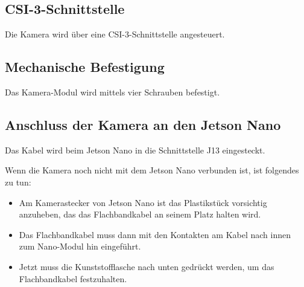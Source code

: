 \bigskip

\subsection{CSI-3-Schnittstelle}



Die Kamera wird über eine CSI-3-Schnittstelle angesteuert. 

\bigskip


\subsection{Mechanische Befestigung}


Das Kamera-Modul wird mittels vier Schrauben befestigt.


\subsection{Anschluss der Kamera an den Jetson Nano}


Das Kabel wird beim Jetson Nano in die Schnittstelle J13 eingesteckt.

Wenn die Kamera noch nicht mit dem Jetson Nano verbunden ist, ist folgendes zu tun:

\medskip

\begin{itemize}
    \item Am Kamerastecker von Jetson Nano ist das Plastikstück vorsichtig anzuheben, das das Flachbandkabel an seinem Platz halten wird. 
    \item Das Flachbandkabel muss dann mit den Kontakten am Kabel nach innen zum Nano-Modul hin eingeführt. 
    \item Jetzt muss die Kunststofflasche nach unten gedrückt werden, um das Flachbandkabel festzuhalten. 
\end{itemize}



